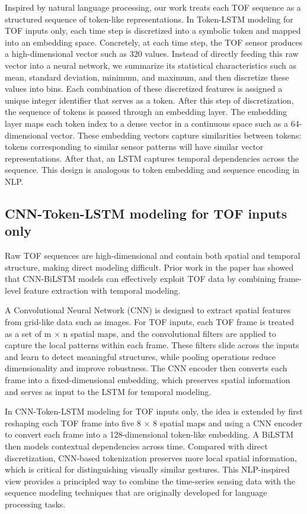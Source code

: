 \documentclass[conference]{IEEEtran}
\begin{document}
Inspired by natural language processing, our work treats each TOF sequence as a structured sequence of token-like representations. In Token-LSTM modeling for TOF inputs only, each time step is discretized into a symbolic token and mapped into an embedding space. Concretely, at each time step, the TOF sensor produces a high-dimensional vector such as 320 values. Instead of directly feeding this raw vector into a neural network, we summarize its statistical characteristics such as mean, standard deviation, minimum, and maximum, and then discretize these values into bins. Each combination of these discretized features is assigned a unique integer identifier that serves as a token. After this step of discretization, the sequence of tokens is passed through an embedding layer. The embedding layer maps each token index to a dense vector in a continuous space such as a 64-dimensional vector. These embedding vectors capture similarities between tokens: tokens corresponding to similar sensor patterns will have similar vector representations. After that, an LSTM captures temporal dependencies across the sequence. This design is analogous to token embedding and sequence encoding in NLP.

\subsection{CNN-Token-LSTM modeling for TOF inputs only}

Raw TOF sequences are high-dimensional and contain both spatial and temporal structure, making direct modeling difficult.
Prior work in the paper\cite{zhang2025baseline} has showed that CNN-BiLSTM models can effectively exploit TOF data by combining frame-level feature extraction with temporal modeling.

A Convolutional Neural Network (CNN) is designed to extract spatial features from grid-like data such as images. For TOF inputs, each TOF frame is treated as a set of m × n spatial maps, and the convolutional filters are applied to capture the local patterns within each frame. These filters slide across the inputs and learn to detect meaningful structures, while pooling operations reduce dimensionality and improve robustness. The CNN encoder then converts each frame into a fixed-dimensional embedding, which preserves spatial information and serves as input to the LSTM for temporal modeling.

In CNN-Token-LSTM modeling for TOF inputs only, the idea is extended by first reshaping each TOF frame into five 8 × 8 spatial maps and using a CNN encoder to convert each frame into a 128-dimensional token-like embedding. A BiLSTM then models contextual dependencies across time. Compared with direct discretization, CNN-based tokenization preserves more local spatial information, which is critical for distinguishing visually similar gestures. This NLP-inspired view provides a principled way to combine the time-series sensing data with the sequence modeling techniques that are originally developed for language processing tasks.
\clearpage
\end{document}
